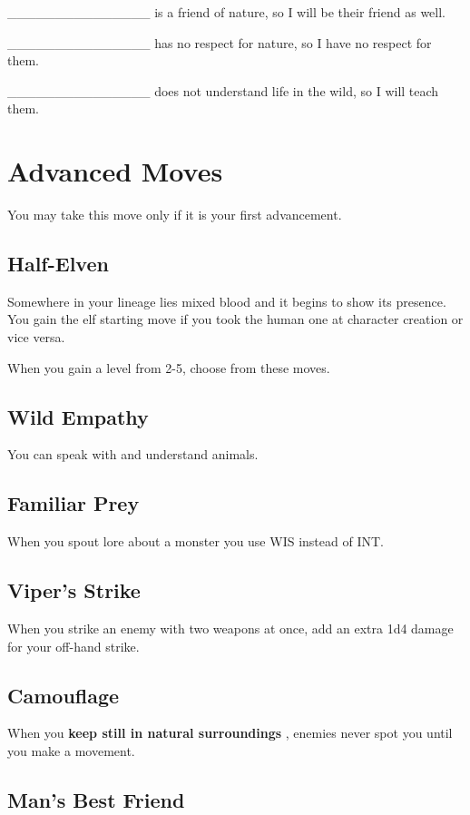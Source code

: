  \_\_\_\_\_\_\_\_\_\_\_\_\_\_\_ is a friend of nature, so I will be their friend as well.


 \_\_\_\_\_\_\_\_\_\_\_\_\_\_\_ has no respect for nature, so I have no respect for them.


 \_\_\_\_\_\_\_\_\_\_\_\_\_\_\_ does not understand life in the wild, so I will teach them.
\section{Advanced Moves}


 You may take this move only if it is your first advancement.
\subsection{Half-Elven}


 Somewhere in your lineage lies mixed blood and it begins to show its presence. You gain the elf starting move if you took the human one at character creation or vice versa.


 {\Large When you gain a level from 2-5, choose from these moves.}
\subsection{Wild Empathy}


 You can speak with and understand animals.
\subsection{Familiar Prey}


 When you spout lore about a monster you use WIS instead of INT.
\subsection{Viper's Strike}


 When you strike an enemy with two weapons at once, add an extra 1d4 damage for your off-hand strike.
\subsection{Camouflage}


 When you \textbf{keep still in natural surroundings}
, enemies never spot you until you make a movement.
\subsection{Man's Best Friend}


